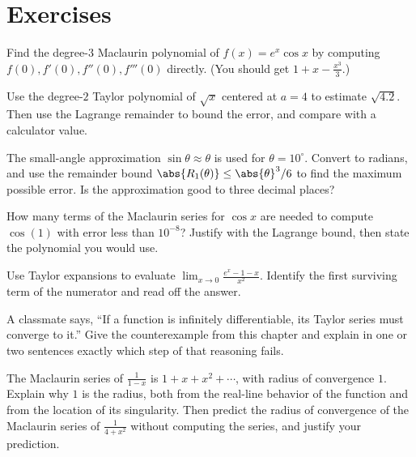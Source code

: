 \section{Exercises}

\begin{exercise}
Find the degree-$3$ Maclaurin polynomial of $f(x) = e^{x}\cos x$ by computing
$f(0), f'(0), f''(0), f'''(0)$ directly. (You should get
$1 + x - \tfrac{x^3}{3}$.)
\end{exercise}

\begin{exercise}
Use the degree-$2$ Taylor polynomial of $\sqrt{x}$ centered at $a = 4$ to estimate
$\sqrt{4.2}$. Then use the Lagrange remainder to bound the error, and compare with a
calculator value.
\end{exercise}

\begin{exercise}
The small-angle approximation $\sin\theta \approx \theta$ is used for
$\theta = 10^\circ$. Convert to radians, and use the remainder bound
$\abs{R_1(\theta)} \le \abs{\theta}^3/6$ to find the maximum possible error. Is the
approximation good to three decimal places?
\end{exercise}

\begin{exercise}
How many terms of the Maclaurin series for $\cos x$ are needed to compute
$\cos(1)$ with error less than $10^{-8}$? Justify with the Lagrange bound, then state
the polynomial you would use.
\end{exercise}

\begin{exercise}
Use Taylor expansions to evaluate
$\displaystyle \lim_{x\to 0}\frac{e^{x} - 1 - x}{x^2}$. Identify the first surviving
term of the numerator and read off the answer.
\end{exercise}

\begin{exercise}[Conceptual]
A classmate says, ``If a function is infinitely differentiable, its Taylor series must
converge to it.'' Give the counterexample from this chapter and explain in one or two
sentences exactly which step of that reasoning fails.
\end{exercise}

\begin{exercise}[Conceptual]
The Maclaurin series of $\frac{1}{1-x}$ is $1 + x + x^2 + \cdots$, with radius of
convergence $1$. Explain why $1$ is the radius, both from the real-line behavior of
the function and from the location of its singularity. Then predict the radius of
convergence of the Maclaurin series of $\frac{1}{4+x^2}$ without computing the series,
and justify your prediction.
\end{exercise}

